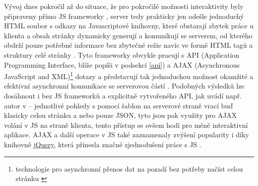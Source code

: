         Vývoj dnes pokročil až do situace, že pro pokročilé možnosti interaktivity byly připraveny přímo JS frameworky \cite{scripting-upwork}, server tedy prakticky jen odešle jednoduchý HTML soubor s odkazy na Javascriptové knihovny, které obstarají zbytek práce u klienta a obsah stránky dynamicky generují a komunikují se serverem, od kterého obdrží pouze potřebné informace bez zbytečné režie navíc ve formě HTML tagů a struktury celé stránky \cite{scripting-fasthosts}. Tyto frameworky obvykle pracují s API (Application Programming Interface, blíže popíši v podsekci \ref{api}) a AJAX (Asynchronous JavaScript and XML)\footnote{technologie pro asynchronní přenos dat na pozadí bez potřeby načíst celou stránku \cite{scripting-fasthosts}} dotazy \cite{scripting-fasthosts} a představují tak jednoduchou možnost okamžité a efektivní asynchronní komunikace se serverovou částí \cite{scripting-upwork}. Podobných výsledků lze dosáhnout i bez JS frameworků a explicitně vytvořeného API, jak uvádí např. autor v \cite{scripting-simpleis} -- jednotlivé pohledy s pomocí šablon na serverové straně vrací buď klasicky celou stránku a nebo pouze JSON, tyto jsou pak využity pro AJAX volání v JS na straně klienta, tento přístup se ovšem hodí pro méně interaktivní aplikace. AJAX a další operace v JS také zaznamenaly zvýšení popularity i díky knihovně \href{http://jquery.com/}{jQuery}, která přinesla značné zjednodušení práce s JS \cite{scripting-upwork}.
        
